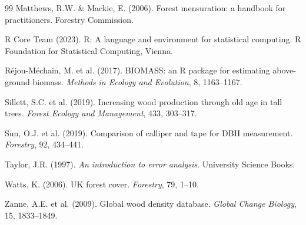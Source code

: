 \documentclass[12pt,a4paper]{article}
\begin{document}
\begin{thebibliography}{99}
 Matthews, R.W. \& Mackie, E. (2006). Forest mensuration: a handbook for practitioners. Forestry Commission.

 R Core Team (2023). R: A language and environment for statistical computing. R Foundation for Statistical Computing, Vienna.

 Réjou-Méchain, M. et al. (2017). BIOMASS: an R package for estimating above-ground biomass. \textit{Methods in Ecology and Evolution}, 8, 1163--1167.

 Sillett, S.C. et al. (2019). Increasing wood production through old age in tall trees. \textit{Forest Ecology and Management}, 433, 303--317.

 Sun, O.J. et al. (2019). Comparison of calliper and tape for DBH measurement. \textit{Forestry}, 92, 434--441.

 Taylor, J.R. (1997). \textit{An introduction to error analysis}. University Science Books.

 Watts, K. (2006). UK forest cover. \textit{Forestry}, 79, 1--10.

 Zanne, A.E. et al. (2009). Global wood density database. \textit{Global Change Biology}, 15, 1833--1849.
\end{thebibliography}
\end{document}

